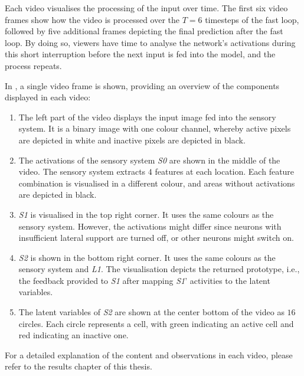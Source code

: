 Each video visualises the processing of the input over time.
The first six video frames show how the video is processed over the $T=6$ timesteps of the fast loop, followed by five additional frames depicting the final prediction after the fast loop.
By doing so, viewers have time to analyse the network's activations during this short interruption before the next input is fed into the model, and the process repeats.

In , a single video frame is shown, providing an overview of the components displayed in each video:
\begin{enumerate}
    \item The left part of the video displays the input image fed into the sensory system. It is a binary image with one colour channel, whereby active pixels are depicted in white and inactive pixels are depicted in black.
    \item The activations of the sensory system \emph{S0} are shown in the middle of the video. The sensory system extracts $4$ features at each location. Each feature combination is visualised in a different colour, and areas without activations are depicted in black.
    \item \emph{S1} is visualised in the top right corner. It uses the same colours as the sensory system. However, the activations might differ since neurons with insufficient lateral support are turned off, or other neurons might switch on.
    \item \emph{S2} is shown in the bottom right corner. It uses the same colours as the sensory system and \emph{L1}. The visualisation depicts the returned prototype, i.e., the feedback provided to \emph{S1} after mapping \emph{S1}' activities to the latent variables.
    \item The latent variables of \emph{S2} are shown at the center bottom of the video as $16$ circles. Each circle represents a cell, with green indicating an active cell and red indicating an inactive one. 
\end{enumerate}

For a detailed explanation of the content and observations in each video, please refer to the results chapter of this thesis.

